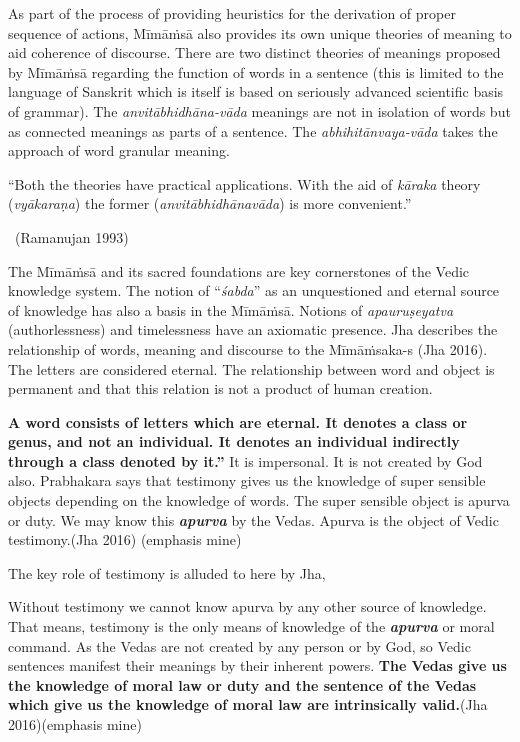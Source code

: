 As part of the process of providing heuristics for the derivation of proper sequence of actions, Mīmāṁsā also provides its own unique theories of meaning to aid coherence of discourse. There are two distinct theories of meanings proposed by Mīmāṁsā regarding the function of words in a sentence (this is limited to the language of Sanskrit which is itself is based on seriously advanced scientific basis of grammar). The \textit{anvitābhidhāna-vāda} meanings are not in isolation of words but as connected meanings as parts of a sentence. The \textit{abhihitānvaya-vāda} takes the approach of word granular meaning.

\begin{myquote}
“Both the theories have practical applications. With the aid of \textit{kāraka} theory (\textit{vyākaraṇa}) the former (\textit{anvitābhidhānavāda}) is more convenient.”

~\hfill (Ramanujan 1993)
\end{myquote}

The Mīmāṁsā and its sacred foundations are key cornerstones of the Vedic knowledge system. The notion of “\textit{śabda}” as an unquestioned and eternal source of knowledge has also a basis in the Mīmāṁsā. Notions of \textit{apauruṣeyatva} (authorlessness) and timelessness have an axiomatic presence. Jha describes the relationship of words, meaning and discourse to the Mīmāṁsaka-s (Jha 2016). The letters are considered eternal. The relationship between word and object is permanent and that this relation is not a product of human creation.

\newpage

\begin{myquote}
\textbf{A word consists of letters which are eternal. It denotes a class or genus, and not an individual. It denotes an individual indirectly through a class denoted by it.”} It is impersonal. It is not created by God also. Prabhakara says that testimony gives us the knowledge of super sensible objects depending on the knowledge of words. The super sensible object is apurva or duty. We may know this \textbf{\textit{apurva}} by the Vedas. Apurva is the object of Vedic testimony.\hfill (Jha 2016) (emphasis mine)
\end{myquote}

The key role of testimony is alluded to here by Jha,

\begin{myquote}
Without testimony we cannot know apurva by any other source of knowledge. That means, testimony is the only means of knowledge of the \textbf{\textit{apurva}} or moral command. As the Vedas are not created by any person or by God, so Vedic sentences manifest their meanings by their inherent powers. \textbf{The Vedas give us the knowledge of moral law or duty and the sentence of the Vedas which give us the knowledge of moral law are intrinsically valid.}\hfill (Jha 2016)(emphasis mine)
\end{myquote}

